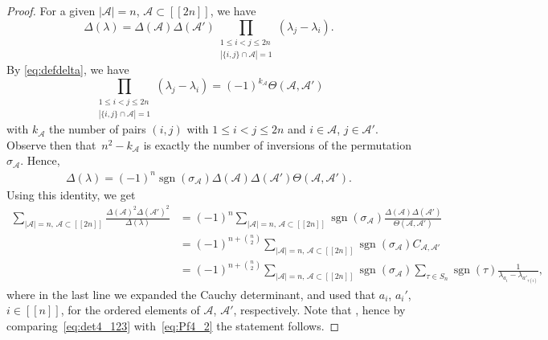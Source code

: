\documentclass[10pt,a4paper]{amsart}
\newcommand{\cA}{\mathcal{A}}
\newcommand{\dd}{\Theta}
\newcommand{\lst}[1]{[\![#1 ]\!]}
\newcommand{\sgn}{\operatorname{sgn}}
\begin{document}
\begin{proof}
For a given $|\cA|=n$, $\cA\subset \lst{2n}$, we have
\[
\Delta(\lambda)=\Delta(\cA)\Delta(\cA') \prod_{\substack{1\le i<j\le 2n\\ \left|\{i,j\}\cap \cA\right|=1}} (\lambda_j-\lambda_i).
\]
By \eqref{eq:defdelta}, we have
\[
\prod_{\substack{1\le i<j\le 2n\\ \left|\{i,j\}\cap \cA\right|=1}} (\lambda_j-\lambda_i)=(-1)^{k_\cA}
\dd(\cA, \cA')
\]
 with $k_{\cA}$ the number of pairs $(i,j)$ with $1\le i<j\le 2n$ and $i\in \cA$, $j\in \cA'$. Observe then that~${n^2-k_{\cA}}$ is exactly the number of inversions of the permutation $\sigma_{\cA}$.
Hence,
 \begin{align}
 \label{eq:det_exp_A_Ac}
\Delta
(\lambda)=(-1)^n \sgn(\sigma_{\cA}) \Delta
(\cA)\Delta
(\cA') \dd(\cA, \cA').
\end{align}
Using this identity, we get
\begin{align}
 \sum_{|\cA|=n,\, \cA\subset\lst{2n}} \frac{\Delta
 (\cA)^2 \Delta
 (\cA')^2}{ \Delta(\lambda)}&=(-1)^n \sum_{|\cA|=n,\, \cA\subset\lst{2n}}
 \sgn(\sigma_{\cA})
 \frac{\Delta(\cA) \Delta(\cA')}{\dd(\cA, \cA')}\nonumber \\
 &=(-1)^{n+\binom{n}{2}}\sum_{|\cA|=n,\, \cA\subset\lst{2n}} \sgn(\sigma_{\cA}) C_{\cA, \cA'}
\nonumber
 \\
 &=(-1)^{n+\binom{n}{2}}\sum_{|\cA|=n,\, \cA\subset\lst{2n}} \sgn(\sigma_{\cA}) \sum_{\tau\in S_n} \sgn(\tau) \frac{1}{\lambda_{a_i}-\lambda_{a'_{\tau(i)}}}, \label{eq:det4_123}
\end{align}
where in the last line we expanded the Cauchy determinant, and used that $a_i$, $a_i'$, $i\in \lst{n}$, for the ordered elements of $\cA$, $\cA'$, respectively.
Note that \smash{$\sgn(\eta_n)=(-1)^{\binom{n}{2}}$}, hence by comparing~\eqref{eq:det4_123} with~\eqref{eq:Pf4_2} the statement follows.
\end{proof}
\end{document}
